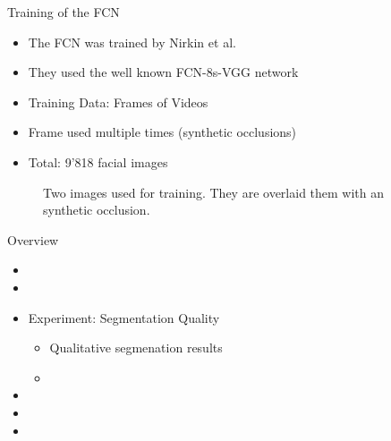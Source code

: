 \documentclass{beamer}
\begin{document}
\begin{frame}[c]{Training of the FCN}
	\begin{itemize}
		\item The FCN was trained by Nirkin et al.
		\item They used the well known FCN-8s-VGG network
		\item Training Data: Frames of Videos
		\item Frame used multiple times (synthetic occlusions)
		\item Total: 9'818 facial images
	\end{itemize}
	\begin{figure}
		\centering
		\qquad
		\caption{Two images used for training. They are overlaid them with an synthetic occlusion.}
	\end{figure}
\end{frame}


\begin{frame}[c]{Overview}
	\begin{itemize}
		\item {}
		\item {}
		\item Experiment: Segmentation Quality
		\begin{itemize}
			\item Qualitative segmenation results
			\item {}
		\end{itemize}
		\item {}
		\item {}
		\item {}
	\end{itemize}
\end{frame}
\end{document}
